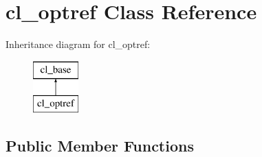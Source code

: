 \hypertarget{classcl__optref}{
\section{cl\_\-optref Class Reference}
\label{classcl__optref}
}
Inheritance diagram for cl\_\-optref:\begin{figure}[H]
\begin{center}
\leavevmode
\includegraphics[height=2.000000cm]{classcl__optref}
\end{center}
\end{figure}
\subsection*{Public Member Functions}

